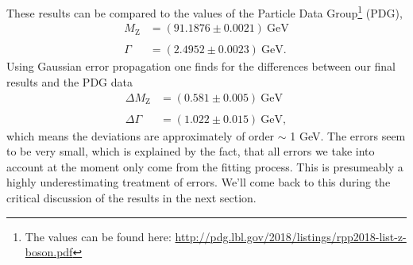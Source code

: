 \documentclass[twocolumn,
			   showpacs,%
               nofootinbib,
               aps,%
               prd,
               notitlepage,
               showkeys,
               10pt]{revtex4-1}
\begin{document}
These results can be compared to the values of the Particle Data Group\footnote{The values can be found here: \url{http://pdg.lbl.gov/2018/listings/rpp2018-list-z-boson.pdf}} (PDG), 
\begin{align}
	M_{\mathrm{Z}}&=(91.1876 \pm 0.0021) \ \mathrm{GeV} \\  \nonumber\\ \Gamma&=(2.4952 \pm 0.0023) \ \mathrm{GeV}.
\end{align} 
Using Gaussian error propagation one finds for the differences between our final results and the PDG data
\begin{align}
	\Delta M_{\mathrm{Z}}&=(0.581 \pm 0.005) \ \mathrm{GeV} \\  \nonumber\\ 
	\Delta\Gamma&=(1.022 \pm 0.015) \ \mathrm{GeV},
\end{align} 
which means the deviations are approximately of order $\sim$ 1 GeV. The errors seem to be very small, which is explained by the fact, that all errors we take into account at the moment only come from the fitting process. This is presumeably a highly underestimating treatment of errors. We'll come back to this during the critical discussion of the results in the next section.
\end{document}
